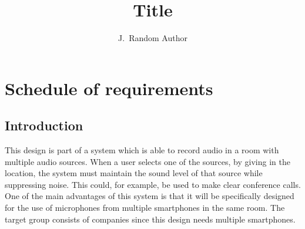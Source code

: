 \documentclass{tudelft-report}
\begin{document}
\frontmatter

\title[Optional Subtitle]{Title}
\author{J.\ Random Author}

%

%


\mainmatter

\chapter{Schedule of requirements}

\section{Introduction}
This design is part of a system which is able to record audio in a room with multiple audio sources. When a user selects one of the sources, by giving in the location, the system must maintain the sound level of that source while suppressing noise. This could, for example, be used to make clear conference calls. One of the main advantages of this system is that it will be specifically designed for the use of microphones from multiple smartphones in the same room. The target group consists of companies since this design needs multiple smartphones.
\end{document}
